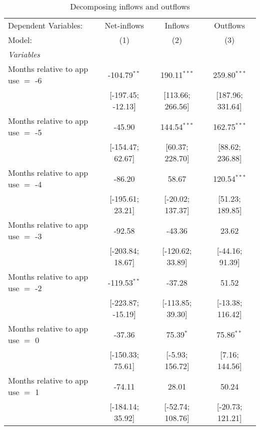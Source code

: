
\begin{table}[htbp]
   \centering
   \tiny
   \begin{threeparttable}[b]
      \caption{\label{tab:inout} Decomposing inflows and outflows}
      \begin{tabular}{lccc}
         \tabularnewline \midrule \midrule
         Dependent Variables:              & Net-inflows       & Inflows          & Outflows\\  
         Model:                            & (1)               & (2)              & (3)\\  
         \midrule
         \emph{Variables}\\
         Months relative to app use $=$ -6 & -104.79$^{**}$    & 190.11$^{***}$   & 259.80$^{***}$\\   
                                           & [-197.45; -12.13] & [113.66; 266.56] & [187.96; 331.64]\\   
         Months relative to app use $=$ -5 & -45.90            & 144.54$^{***}$   & 162.75$^{***}$\\   
                                           & [-154.47; 62.67]  & [60.37; 228.70]  & [88.62; 236.88]\\   
         Months relative to app use $=$ -4 & -86.20            & 58.67            & 120.54$^{***}$\\   
                                           & [-195.61; 23.21]  & [-20.02; 137.37] & [51.23; 189.85]\\   
         Months relative to app use $=$ -3 & -92.58            & -43.36           & 23.62\\   
                                           & [-203.84; 18.67]  & [-120.62; 33.89] & [-44.16; 91.39]\\   
         Months relative to app use $=$ -2 & -119.53$^{**}$    & -37.28           & 51.52\\   
                                           & [-223.87; -15.19] & [-113.85; 39.30] & [-13.38; 116.42]\\   
         Months relative to app use $=$ 0  & -37.36            & 75.39$^{*}$      & 75.86$^{**}$\\   
                                           & [-150.33; 75.61]  & [-5.93; 156.72]  & [7.16; 144.56]\\   
         Months relative to app use $=$ 1  & -74.11            & 28.01            & 50.24\\   
                                           & [-184.14; 35.92]  & [-52.74; 108.76] & [-20.73; 121.21]\\   

\end{tabular}
\end{threeparttable}
\end{table}
